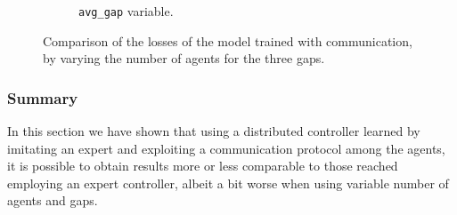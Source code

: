\begin{figure}[!htb]
\begin{center}
\begin{subfigure}[h]{0.32\textwidth}
			\caption{\texttt{avg\_gap} variable.}
		\end{subfigure}
	\end{center}
	\vspace{-0.5cm}
	\caption[Losses summary of the second set of experiments 
	(communication).]{Comparison of the losses of the model trained with 
		communication, by varying the number of agents for the three gaps.}
	\label{fig:commlossexte81324}
\end{figure}


\subsubsection{Summary}
\label{subsubsec:commsummary}
In this section we have shown that using a distributed controller learned by 
imitating an expert and exploiting a communication protocol among the 
agents, it is possible to obtain results more or less comparable to those reached 
employing an expert controller, albeit a bit worse when using variable number of 
agents and gaps.
